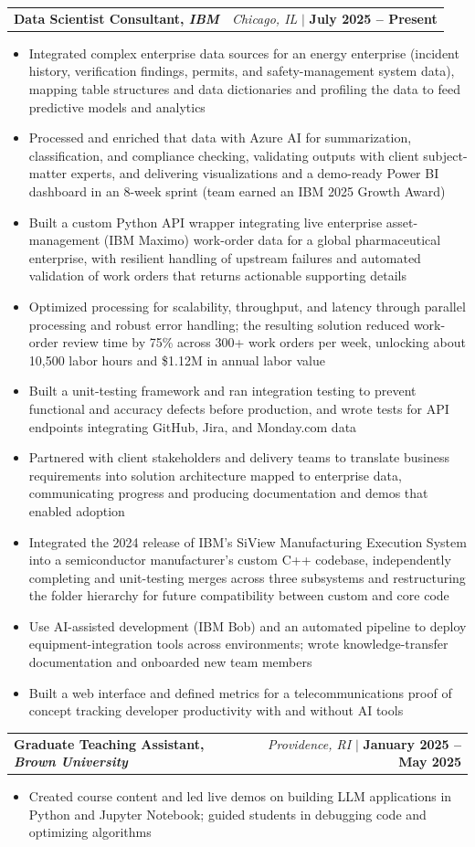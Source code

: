 \documentclass[letterpaper,10pt]{article}
\makeatletter
\newcommand{\resumeItem}[1]{
  \item\small{
    {#1 \vspace{-2pt}}
  }
}
\newcommand{\resumeSubheading}[4]{
  \item
  \begin{tabular*}{\textwidth}{l@{\extracolsep{\fill}}r}
    \textbf{#1, \small \emph{#3}} & \small{\emph{#4}} $|$ \small{\textbf{#2}} \\
  \end{tabular*}\vspace{-7pt}
}
\newcommand{\resumeItemListStart}{\begin{itemize}}
\newcommand{\resumeItemListEnd}{\end{itemize}\vspace{-5pt}}
\makeatother
\begin{document}
\resumeSubheading
  {Data Scientist Consultant}{July 2025 -- Present}
  {IBM}{Chicago, IL}
  \resumeItemListStart
    \resumeItem{Integrated complex enterprise data sources for an energy enterprise (incident history, verification findings, permits, and safety-management system data), mapping table structures and data dictionaries and profiling the data to feed predictive models and analytics}
    \resumeItem{Processed and enriched that data with Azure AI for summarization, classification, and compliance checking, validating outputs with client subject-matter experts, and delivering visualizations and a demo-ready Power BI dashboard in an 8-week sprint (team earned an IBM 2025 Growth Award)}
    \resumeItem{Built a custom Python API wrapper integrating live enterprise asset-management (IBM Maximo) work-order data for a global pharmaceutical enterprise, with resilient handling of upstream failures and automated validation of work orders that returns actionable supporting details}
    \resumeItem{Optimized processing for scalability, throughput, and latency through parallel processing and robust error handling; the resulting solution reduced work-order review time by 75\% across 300+ work orders per week, unlocking about 10,500 labor hours and \$1.12M in annual labor value}
    \resumeItem{Built a unit-testing framework and ran integration testing to prevent functional and accuracy defects before production, and wrote tests for API endpoints integrating GitHub, Jira, and Monday.com data}
    \resumeItem{Partnered with client stakeholders and delivery teams to translate business requirements into solution architecture mapped to enterprise data, communicating progress and producing documentation and demos that enabled adoption}
    \resumeItem{Integrated the 2024 release of IBM's SiView Manufacturing Execution System into a semiconductor manufacturer's custom C++ codebase, independently completing and unit-testing merges across three subsystems and restructuring the folder hierarchy for future compatibility between custom and core code}
    \resumeItem{Use AI-assisted development (IBM Bob) and an automated pipeline to deploy equipment-integration tools across environments; wrote knowledge-transfer documentation and onboarded new team members}
    \resumeItem{Built a web interface and defined metrics for a telecommunications proof of concept tracking developer productivity with and without AI tools}
  \resumeItemListEnd

\resumeSubheading
  {Graduate Teaching Assistant}{January 2025 -- May 2025}
  {Brown University}{Providence, RI}
  \resumeItemListStart
    \resumeItem{Created course content and led live demos on building LLM applications in Python and Jupyter Notebook; guided students in debugging code and optimizing algorithms}
  \resumeItemListEnd
\end{document}
